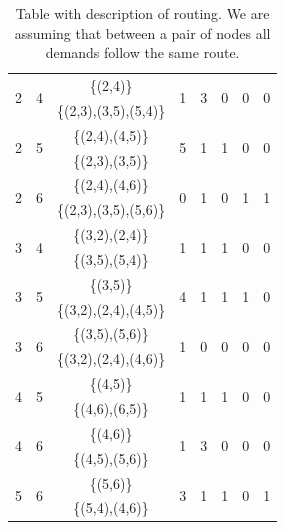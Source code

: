 \begin{table}[h!]
\begin{tabular}{|| c | c | c | c | c | c | c | c ||}
 \multirow{2}{*}{2} & \multirow{2}{*}{4} & \{(2,4)\} & \multirow{2}{*}{1} & \multirow{2}{*}{3} & \multirow{2}{*}{0} & \multirow{2}{*}{0} & \multirow{2}{*}{0}\\
 & & \{(2,3),(3,5),(5,4)\} & & & & &\\ \hline
 \multirow{2}{*}{2} & \multirow{2}{*}{5} & \{(2,4),(4,5)\} & \multirow{2}{*}{5} & \multirow{2}{*}{1} & \multirow{2}{*}{1} & \multirow{2}{*}{0} & \multirow{2}{*}{0}\\
 & & \{(2,3),(3,5)\} & & & & &\\ \hline
 \multirow{2}{*}{2} & \multirow{2}{*}{6} & \{(2,4),(4,6)\} & \multirow{2}{*}{0} & \multirow{2}{*}{1} & \multirow{2}{*}{0} & \multirow{2}{*}{1} & \multirow{2}{*}{1}\\
 & & \{(2,3),(3,5),(5,6)\} & & & & &\\ \hline
 \multirow{2}{*}{3} & \multirow{2}{*}{4} & \{(3,2),(2,4)\} & \multirow{2}{*}{1} & \multirow{2}{*}{1} & \multirow{2}{*}{1} & \multirow{2}{*}{0} & \multirow{2}{*}{0}\\
 & & \{(3,5),(5,4)\} & & & & &\\ \hline
 \multirow{2}{*}{3} & \multirow{2}{*}{5} & \{(3,5)\} & \multirow{2}{*}{4} & \multirow{2}{*}{1} & \multirow{2}{*}{1} & \multirow{2}{*}{1} & \multirow{2}{*}{0}\\
 & & \{(3,2),(2,4),(4,5)\} & & & & &\\ \hline
 \multirow{2}{*}{3} & \multirow{2}{*}{6} & \{(3,5),(5,6)\} & \multirow{2}{*}{1} & \multirow{2}{*}{0} & \multirow{2}{*}{0} & \multirow{2}{*}{0} & \multirow{2}{*}{0}\\
 & & \{(3,2),(2,4),(4,6)\} & & & & &\\ \hline
 \multirow{2}{*}{4} & \multirow{2}{*}{5} & \{(4,5)\} & \multirow{2}{*}{1} & \multirow{2}{*}{1} & \multirow{2}{*}{1} & \multirow{2}{*}{0} & \multirow{2}{*}{0}\\
 & & \{(4,6),(6,5)\} & & & & &\\ \hline
 \multirow{2}{*}{4} & \multirow{2}{*}{6} & \{(4,6)\} & \multirow{2}{*}{1} & \multirow{2}{*}{3} & \multirow{2}{*}{0} & \multirow{2}{*}{0} & \multirow{2}{*}{0}\\
 & & \{(4,5),(5,6)\} & & & & &\\ \hline
 \multirow{2}{*}{5} & \multirow{2}{*}{6} & \{(5,6)\} & \multirow{2}{*}{3} & \multirow{2}{*}{1} & \multirow{2}{*}{1} & \multirow{2}{*}{0} & \multirow{2}{*}{1}\\
 & & \{(5,4),(4,6)\} & & & & &\\
 \hline
\end{tabular}
\caption{Table with description of routing. We are assuming that between a pair of nodes all demands follow the same route.}
\label{path_opaque_protec_ref_high}
\end{table}


